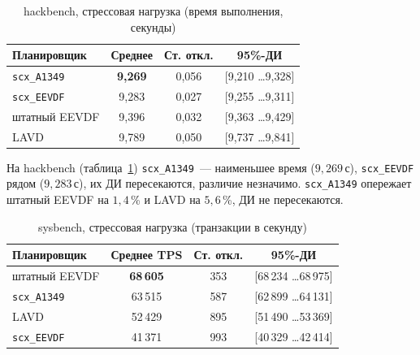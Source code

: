 \documentclass[14pt, oneside]{extbook}
\begin{document}
        \begin{table}[H]
                \centering
                \caption{hackbench, стрессовая нагрузка (время выполнения, секунды)}
                \label{tab:stress_hackbench}
                \vspace{0.4em}
                \begin{tabular}{|l|c|c|c|}
                        \hline
                        Планировщик & Среднее & Ст. откл. & 95\%-ДИ \\
                        \hline
                        \texttt{scx\_A1349} & \textbf{9{,}269} & 0{,}056 & [9{,}210 \dots 9{,}328] \\
                        \texttt{scx\_EEVDF} & 9{,}283 & 0{,}027 & [9{,}255 \dots 9{,}311] \\
                        штатный EEVDF & 9{,}396 & 0{,}032 & [9{,}363 \dots 9{,}429] \\
                        LAVD & 9{,}789 & 0{,}050 & [9{,}737 \dots 9{,}841] \\
                        \hline
                \end{tabular}
        \end{table}

        На hackbench (таблица~\ref{tab:stress_hackbench})
        \texttt{scx\_A1349}~--- наименьшее время ($9{,}269$\,с),
        \texttt{scx\_EEVDF} рядом ($9{,}283$\,с), их ДИ
        пересекаются, различие незначимо. \texttt{scx\_A1349}
        опережает штатный EEVDF на $1{,}4$\,\% и LAVD на
        $5{,}6$\,\%, ДИ не пересекаются.

        \begin{table}[H]
                \centering
                \caption{sysbench, стрессовая нагрузка (транзакции в секунду)}
                \label{tab:stress_sysbench}
                \vspace{0.4em}
                \begin{tabular}{|l|c|c|c|}
                        \hline
                        Планировщик & Среднее TPS & Ст. откл. & 95\%-ДИ \\
                        \hline
                        штатный EEVDF & \textbf{68\,605} & 353 & [68\,234 \dots 68\,975] \\
                        \texttt{scx\_A1349} & 63\,515 & 587 & [62\,899 \dots 64\,131] \\
                        LAVD & 52\,429 & 895 & [51\,490 \dots 53\,369] \\
                        \texttt{scx\_EEVDF} & 41\,371 & 993 & [40\,329 \dots 42\,414] \\
                        \hline
                \end{tabular}
        \end{table}
\end{document}

